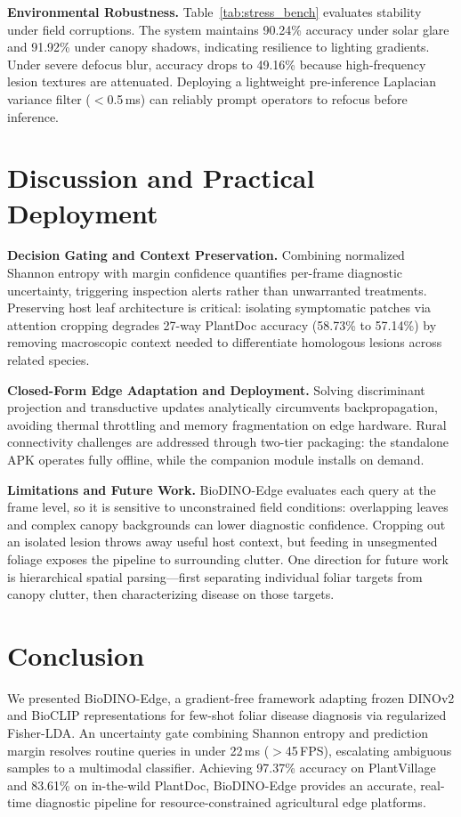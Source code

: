 \documentclass[conference]{IEEEtran}
\begin{document}
\textbf{Environmental Robustness.} Table~\ref{tab:stress_bench} evaluates stability under field corruptions. The system maintains 90.24\% accuracy under solar glare and 91.92\% under canopy shadows, indicating resilience to lighting gradients. Under severe defocus blur, accuracy drops to 49.16\% because high-frequency lesion textures are attenuated. Deploying a lightweight pre-inference Laplacian variance filter ($<$0.5\,ms) can reliably prompt operators to refocus before inference.

\section{Discussion and Practical Deployment}
\textbf{Decision Gating and Context Preservation.} Combining normalized Shannon entropy with margin confidence quantifies per-frame diagnostic uncertainty, triggering inspection alerts rather than unwarranted treatments. Preserving host leaf architecture is critical: isolating symptomatic patches via attention cropping degrades 27-way PlantDoc accuracy (58.73\% to 57.14\%) by removing macroscopic context needed to differentiate homologous lesions across related species.

\textbf{Closed-Form Edge Adaptation and Deployment.} Solving discriminant projection and transductive updates analytically circumvents backpropagation, avoiding thermal throttling and memory fragmentation on edge hardware. Rural connectivity challenges are addressed through two-tier packaging: the standalone APK operates fully offline, while the companion module installs on demand.

\textbf{Limitations and Future Work.} BioDINO-Edge evaluates each query at the frame level, so it is sensitive to unconstrained field conditions: overlapping leaves and complex canopy backgrounds can lower diagnostic confidence. Cropping out an isolated lesion throws away useful host context, but feeding in unsegmented foliage exposes the pipeline to surrounding clutter. One direction for future work is hierarchical spatial parsing---first separating individual foliar targets from canopy clutter, then characterizing disease on those targets.

\section{Conclusion}
We presented BioDINO-Edge, a gradient-free framework adapting frozen DINOv2 and BioCLIP representations for few-shot foliar disease diagnosis via regularized Fisher-LDA. An uncertainty gate combining Shannon entropy and prediction margin resolves routine queries in under 22\,ms ($>$45\,FPS), escalating ambiguous samples to a multimodal classifier. Achieving 97.37\% accuracy on PlantVillage and 83.61\% on in-the-wild PlantDoc, BioDINO-Edge provides an accurate, real-time diagnostic pipeline for resource-constrained agricultural edge platforms.
\end{document}
